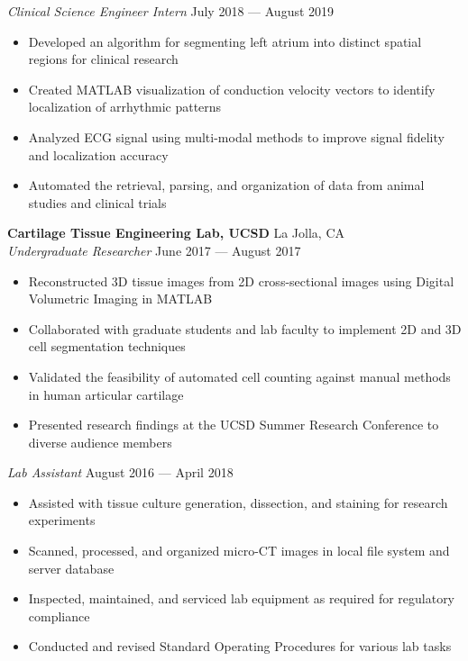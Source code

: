 \documentclass{article}
\begin{document}
\textit{Clinical Science Engineer Intern} \hfill July 2018 --- August 2019\\
\vspace{-2mm}
\begin{itemize} \itemsep 0.05pt
	\item Developed an algorithm for segmenting left atrium into distinct spatial regions for clinical research
	\item Created MATLAB visualization of conduction velocity vectors to identify localization of arrhythmic patterns
	\item Analyzed ECG signal using multi-modal methods to improve signal fidelity and localization accuracy
	\item Automated the retrieval, parsing, and organization of data from animal studies and clinical trials
\end{itemize}


\textbf{Cartilage Tissue Engineering Lab, UCSD} \hfill La Jolla, CA\\
\textit{Undergraduate Researcher} \hfill June 2017 --- August 2017\\
\vspace{-2mm}
\begin{itemize} \itemsep 0.05pt
	\item Reconstructed 3D tissue images from 2D cross-sectional images using Digital Volumetric Imaging in MATLAB
	\item Collaborated with graduate students and lab faculty to implement 2D and 3D cell segmentation techniques
	\item Validated the feasibility of automated cell counting against manual methods in human articular cartilage
	\item Presented research findings at the UCSD Summer Research Conference to diverse audience members
\end{itemize}


\textit{Lab Assistant} \hfill August 2016 --- April 2018\\
\vspace{-2mm}
\begin{itemize} \itemsep 0.05pt
	\item Assisted with tissue culture generation, dissection, and staining for research experiments
	\item Scanned, processed, and organized micro-CT images in local file system and server database
	\item Inspected, maintained, and serviced lab equipment as required for regulatory compliance
	\item Conducted and revised Standard Operating Procedures for various lab tasks
\end{itemize}
\end{document}
